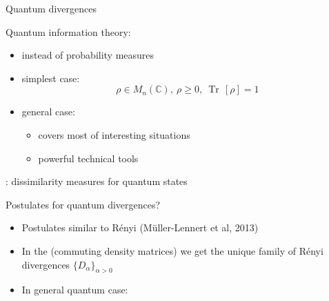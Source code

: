 \documentclass[mathserif]{beamer}
\newcommand{\<}{\langle}
\renewcommand{\>}{\rangle}
\newcommand{\Tr}{\operatorname{Tr}\,}
\begin{document}
\begin{frame}{Quantum divergences}


Quantum information theory:  

\medskip
\begin{itemize}
\item {} instead of probability measures
\vskip 2mm
\item simplest case: 
\[
\rho\in M_n(\mathbb C),\ \rho\ge 0,\ \Tr[\rho]=1
\]
\item general case: 
\vskip 2mm
\begin{itemize}
\item covers most of interesting situations
\vskip 2mm
\item powerful technical tools

\end{itemize}

\end{itemize}

\medskip

: dissimilarity measures for quantum states

\end{frame}

\begin{frame}{Postulates for quantum divergences?}

\begin{itemize}
\item Postulates similar to R\'enyi {\small (M\"uller-Lennert et al, 2013)}
\vskip 5mm

\item In the   (commuting density matrices) we get 
the unique family of R\'enyi divergences
$\{D_\alpha\}_{\alpha>0}$

\vskip 5mm
\item In general quantum case: 


\end{itemize}


\end{frame}
\end{document}
